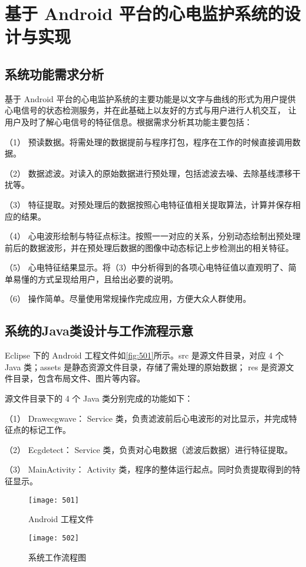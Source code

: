 \chapter{基于 Android 平台的心电监护系统的设计与实现}
\section{系统功能需求分析 }
基于 Android 平台的心电监护系统的主要功能是以文字与曲线的形式为用户提供心电信号的状态检测服务，并在此基础上以友好的方式与用户进行人机交互，
让用户及时了解心电信号的特征信息\cite{23,24,25,26}。根据需求分析其功能主要包括： 

（1）	预读数据。将需处理的数据提前与程序打包，程序在工作的时候直接调用数据。 

（2）	数据滤波。对读入的原始数据进行预处理，包括滤波去噪、去除基线漂移干扰等。 

（3）	特征提取。对预处理后的数据按照心电特征值相关提取算法，计算并保存相应的结果。 

（4）	心电波形绘制与特征点标注。按照一一对应的关系，分别动态绘制出预处理前后的数据波形，并在预处理后数据的图像中动态标记上步检测出的相关特征。 

（5）	心电特征结果显示。将（3）中分析得到的各项心电特征值以直观明了、简单易懂的方式呈现给用户，且给出必要的说明。 

（6）	操作简单。尽量使用常规操作完成应用，方便大众人群使用。 

\section{系统的Java类设计与工作流程示意 }
Eclipse 下的 Android 工程文件如\autoref{fig:501}所示。src 是源文件目录，对应 4 个 Java 类；assets 是静态资源文件目录，存储了需处理的原始数据；
res 是资源文件目录，包含布局文件、图片等内容。 

源文件目录下的 4 个 Java 类分别完成的功能如下： 

（1）	Drawecgwave： Service 类，负责滤波前后心电波形的对比显示，并完成特征点的标记工作。 

（2）	Ecgdetect： Service 类，负责对心电数据（滤波后数据）进行特征提取。 

（3）	MainActivity： Activity 类，程序的整体运行起点。同时负责提取得到的特征显示。 

\begin{figure}[htbp]
    \centering
    \texttt{[image: 501]}
    \caption{\label{fig:501} Android 工程文件}
\end{figure}
\begin{figure}[htbp]
    \centering
    \texttt{[image: 502]}
    \caption{\label{fig:502} 系统工作流程图 }
\end{figure}

